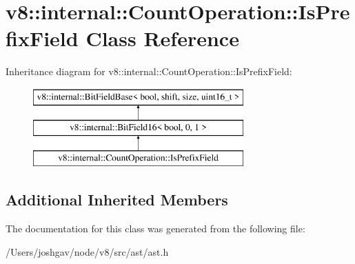\hypertarget{classv8_1_1internal_1_1_count_operation_1_1_is_prefix_field}{}\section{v8\+:\+:internal\+:\+:Count\+Operation\+:\+:Is\+Prefix\+Field Class Reference}
\label{classv8_1_1internal_1_1_count_operation_1_1_is_prefix_field}
Inheritance diagram for v8\+:\+:internal\+:\+:Count\+Operation\+:\+:Is\+Prefix\+Field\+:\begin{figure}[H]
\begin{center}
\leavevmode
\includegraphics[height=3.000000cm]{classv8_1_1internal_1_1_count_operation_1_1_is_prefix_field}
\end{center}
\end{figure}
\subsection*{Additional Inherited Members}


The documentation for this class was generated from the following file\+:\begin{DoxyCompactItemize}
\item 
/\+Users/joshgav/node/v8/src/ast/ast.\+h\end{DoxyCompactItemize}
